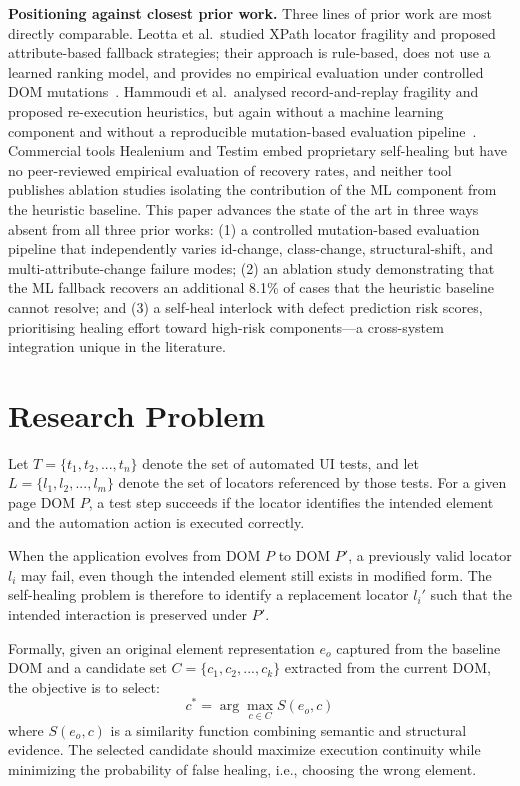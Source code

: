 \documentclass[conference]{IEEEtran}
\begin{document}
\textbf{Positioning against closest prior work.} Three lines of prior work are most directly comparable. Leotta et al.\ studied XPath locator fragility and proposed attribute-based fallback strategies; their approach is rule-based, does not use a learned ranking model, and provides no empirical evaluation under controlled DOM mutations~\cite{leotta2016}. Hammoudi et al.\ analysed record-and-replay fragility and proposed re-execution heuristics, but again without a machine learning component and without a reproducible mutation-based evaluation pipeline~\cite{hammoudi2016}. Commercial tools Healenium and Testim embed proprietary self-healing but have no peer-reviewed empirical evaluation of recovery rates, and neither tool publishes ablation studies isolating the contribution of the ML component from the heuristic baseline. This paper advances the state of the art in three ways absent from all three prior works: (1) a controlled mutation-based evaluation pipeline that independently varies id-change, class-change, structural-shift, and multi-attribute-change failure modes; (2) an ablation study demonstrating that the ML fallback recovers an additional 8.1\% of cases that the heuristic baseline cannot resolve; and (3) a self-heal interlock with defect prediction risk scores, prioritising healing effort toward high-risk components---a cross-system integration unique in the literature.

\section{Research Problem}
Let $T = \{t_1, t_2, ..., t_n\}$ denote the set of automated UI tests, and let $L = \{l_1, l_2, ..., l_m\}$ denote the set of locators referenced by those tests. For a given page DOM $P$, a test step succeeds if the locator identifies the intended element and the automation action is executed correctly.

When the application evolves from DOM $P$ to DOM $P'$, a previously valid locator $l_i$ may fail, even though the intended element still exists in modified form. The self-healing problem is therefore to identify a replacement locator $l_i'$ such that the intended interaction is preserved under $P'$.

Formally, given an original element representation $e_o$ captured from the baseline DOM and a candidate set $C = \{c_1, c_2, ..., c_k\}$ extracted from the current DOM, the objective is to select:
\[
 c^* = \arg\max_{c \in C} S(e_o, c)
\]
where $S(e_o, c)$ is a similarity function combining semantic and structural evidence. The selected candidate should maximize execution continuity while minimizing the probability of false healing, i.e., choosing the wrong element.
\end{document}
